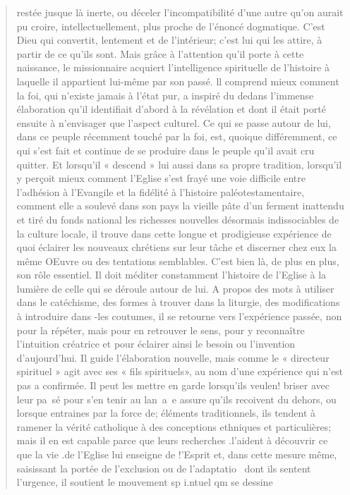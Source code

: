 \begin{quote}
restée jusque là inerte, ou déceler l'incompatibilité
d'une autre qu'on aurait pu croire, intellectuellement,
plus proche de l'énoncé dogmatique. C'est Dieu qui
convertit, lentement et de l'intérieur; c'est lui qui les
attire, à partir de ce qu'ils sont. Mais grâce à l'attention
qu'il porte à cette naissance, le missionnaire acquiert
l'intelligence spirituelle de l'histoire à laquelle il appartient
lui-même par son passé. ll comprend mieux comment
la foi, qui n'existe jamais à l'état pur, a inspiré
du dedans l'immense élaboration qu'il identifiait d'abord
à la révélation et dont il était porté ensuite à n'envisager
que l'aspect culturel. Ce qui se passe autour de lui,
dans ce peuple récemment touché par la foi, est, quoique
différemment, ce qui s'est fait et continue de se produire
dans le peuple qu'il avait cru quitter. Et lorsqu'il
« descend » lui aussi dans sa propre tradition, lorsqu'il
y perçoit mieux comment l'Eglise s'est frayé une voie
difficile entre l'adhésion à l'Evangile et la fidélité à l'histoire
paléotestamentaire, comment elle a soulevé dans
son pays la vieille pâte d'un ferment inattendu et tiré
du fonds national les richesses nouvelles désormais
indissociables de la culture locale, il trouve dans cette
longue et prodigieuse expérience de quoi éclairer les
nouveaux chrétiens sur leur tâche et discerner chez eux
la même OEuvre ou des tentations semblables.
C'est bien là, de plus en plus, son rôle essentiel. Il doit
méditer constamment l'histoire de l'Eglise à la lumière
de celle qui se déroule autour de lui. A propos des mots
à utiliser dans le catéchisme, des formes à trouver dans
la liturgie, des modifications à introduire dans -les coutumes,
il se  retourne vers l'expérience passée, non pour
la répéter, mais pour en  retrouver le sens, pour y  reconnaître
l'intuition créatrice et pour éclairer ainsi le besoin
ou l'invention d'aujourd'hui. Il guide l'élaboration nouvelle,
mais comme le « directeur spirituel » agit avec ses
« fils spirituels», au nom d'une expérience qui n'est pas a confirmée. Il peut les mettre en garde lorsqu'ils veulen!
briser avec leur pa~sé pour s'en tenir au lan~a~e assure
qu'ils recoivent du dehors, ou lorsque entraines par la
force de; éléments traditionnels, ils tendent à ramener
la vérité catholique à des conceptions ethniques et particulières;
mais il en est capable parce que leurs recherches
.l'aident à découvrir ce que la vie .de l'Eglise lui enseigne
de !'Esprit et, dans cette mesure même, saisissant la
portée de l'exclusion ou de l'adaptatio~ dont ils sentent
l'urgence, il soutient le mouvement sp i.ntuel qm se dessine

\end{quote}
